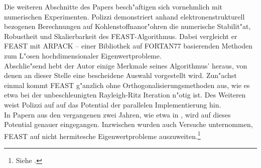 Die weiteren Abschnitte des Papers besch"aftigen sich vornehmlich mit numerischen Experimenten. Polizzi demonstriert anhand elektronenstrukturell bezogenen Berechnungen auf Kohlenstoffnanor"ohren die numerische Stabilit"at, Robustheit und Skalierbarkeit des FEAST-Algorithmus. Dabei vergleicht er FEAST mit ARPACK -- einer Bibliothek auf FORTAN77 basierenden Methoden zum L"osen hochdimensionaler Eigenwertprobleme.\\

Abschlie"send hebt der Autor einige Merkmale seines Algorithmus' heraus, von denen an dieser Stelle eine bescheidene Auswahl vorgestellt wird. Zun"achst einmal kommt FEAST g"anzlich ohne Orthogonalisierungsmethoden aus, wie es etwa bei der unbeschleunigten Rayleigh-Ritz Iteration n"otig ist. Des Weiteren weist Polizzi auf auf das Potential der parallelen Implementierung hin.\\

In Papern aus den vergangenen zwei Jahren, wie etwa in \cite[Abschnitt 4.1]{kpt}, wird auf dieses Potential genauer eingegangen. Inzwischen wurden auch Versuche unternommen, FEAST auf nicht hermitesche Eigenwertprobleme auszuweiten.\footnote{Siehe \cite{kpt}.}

